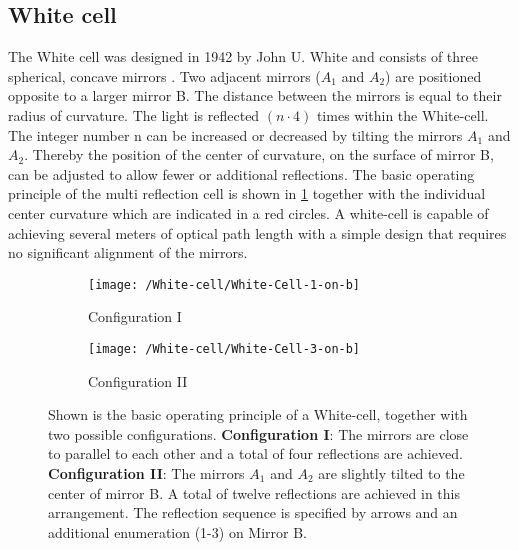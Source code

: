\subsection{White cell}
The White cell was designed in 1942 by John U. White and consists of three spherical, concave mirrors \cite{White1942}. Two adjacent mirrors ($A_1$ and $A_2$) are positioned opposite to a larger mirror B. The distance between the mirrors is equal to their radius of curvature. The light is reflected $(n\cdot4)$ times within the White-cell. The integer number n can be increased or decreased by tilting the mirrors $A_1$ and $A_2$. Thereby the position of the center of curvature, on the surface of mirror B, can be adjusted to allow fewer or additional reflections. The basic operating principle of the multi reflection cell is shown in \ref{Figure:White-cell} together with the individual center curvature which are indicated in a red circles. A white-cell is capable of achieving several meters of optical path length with a simple design that requires no significant alignment of the mirrors.
\begin{figure}[H]
	\centering
	\begin{subfigure}{.5\textwidth}
		\centering
		\texttt{[image: /White-cell/White-Cell-1-on-b]}
		\caption{Configuration I}
	\end{subfigure}%
	\begin{subfigure}{.5\textwidth}
		\centering
		\texttt{[image: /White-cell/White-Cell-3-on-b]}
		\caption{Configuration II}
	\end{subfigure}
	\caption{Shown is the basic operating principle of a White-cell, together with two possible configurations. \textbf{Configuration I}: The mirrors are close to parallel to each other and a total of four reflections are achieved. \textbf{Configuration II}: The mirrors $A_1$ and $A_2$ are slightly tilted to the center of mirror B. A total of twelve reflections are achieved in this arrangement. The reflection sequence is specified by arrows and an additional enumeration (1-3) on Mirror B.}
	\label{Figure:White-cell}
\end{figure}
\newpage
